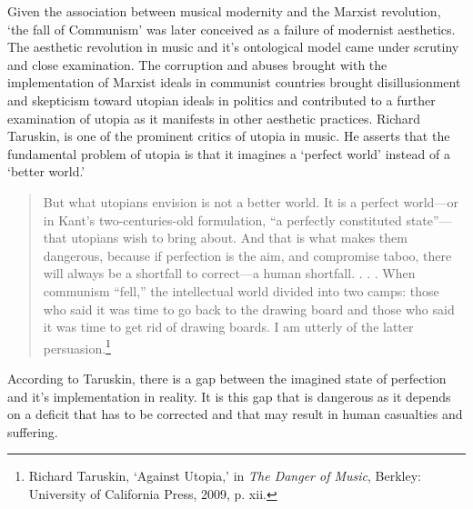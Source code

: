 Given the association between musical modernity and the Marxist revolution, `the fall of Communism' was later conceived as a failure of modernist aesthetics. The aesthetic revolution in music and it's ontological model came under scrutiny and close examination. The corruption and abuses brought with the implementation of Marxist ideals in communist countries brought disillusionment and skepticism toward utopian ideals in politics and contributed to a further examination of utopia as it manifests in other aesthetic practices. Richard Taruskin, is one of the prominent critics of utopia in music. He asserts that the fundamental problem of utopia is that it imagines a `perfect world' instead of a `better world.'
\begin{quote}
But what utopians envision is not a better world. It is a perfect world---or in Kant's two-centuries-old formulation, ``a perfectly constituted state''---that utopians wish to bring about. And that is what makes them dangerous, because if perfection is the aim, and compromise taboo, there will always be a shortfall to correct---a human shortfall. . . . When communism ``fell,'' the intellectual world divided into two camps: those who said it was time to go back to the drawing board and those who said it was time to get rid of drawing boards. I am utterly of the latter persuasion.\footnote{Richard Taruskin, `Against Utopia,' in \emph{The Danger of Music}, Berkley: University of California Press, 2009, p. xii.}
\end{quote}
According to Taruskin, there is a gap between the imagined state of perfection and it's implementation in reality. It is this gap that is dangerous as it depends on a deficit that has to be corrected and that may result in human casualties and suffering. 

